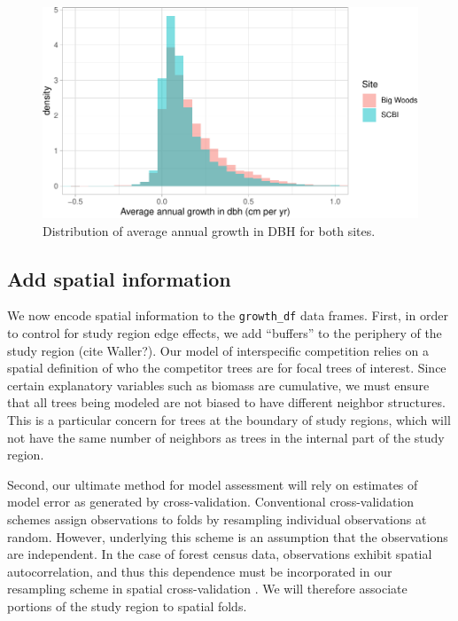 \documentclass[12pt]{article}
\begin{document}
\begin{figure}

{\centering \includegraphics[width=1\linewidth]{Figures/growth-histogram-1} 

}

\caption{Distribution of average annual growth in DBH for both sites.}\label{fig:growth-histogram}
\end{figure}

\hypertarget{spatial-information}{%
\subsection{Add spatial information}\label{spatial-information}}

We now encode spatial information to the \texttt{growth\_df} data
frames. First, in order to control for study region edge effects, we add
``buffers'' to the periphery of the study region (cite Waller?). Our
model of interspecific competition relies on a spatial definition of who
the competitor trees are for focal trees of interest. Since certain
explanatory variables such as biomass are cumulative, we must ensure
that all trees being modeled are not biased to have different neighbor
structures. This is a particular concern for trees at the boundary of
study regions, which will not have the same number of neighbors as trees
in the internal part of the study region.

Second, our ultimate method for model assessment will rely on estimates
of model error as generated by cross-validation. Conventional
cross-validation schemes assign observations to folds by resampling
individual observations at random. However, underlying this scheme is an
assumption that the observations are independent. In the case of forest
census data, observations exhibit spatial autocorrelation, and thus this
dependence must be incorporated in our resampling scheme in spatial
cross-validation \citet{roberts2017} \citet{pohjankukka2017}. We will
therefore associate portions of the study region to spatial folds.
\end{document}
